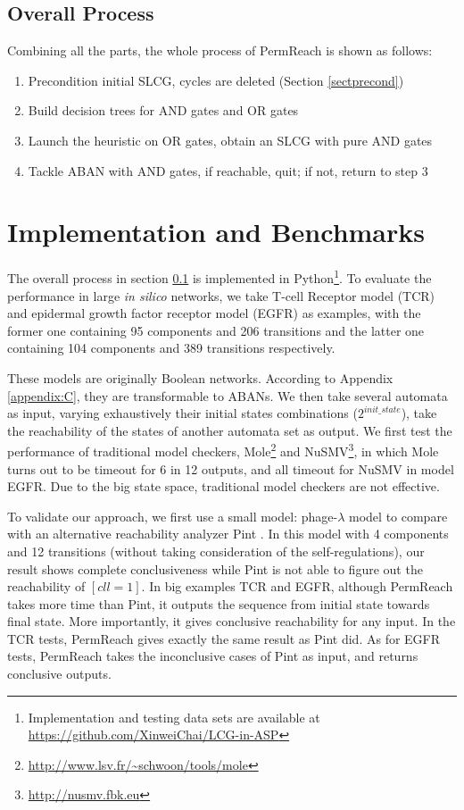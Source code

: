 \documentclass[runningheads]{llncs}
\begin{document}
\subsection{Overall Process}\label{sectOverall}
Combining all the parts, the whole process of PermReach is shown as follows:
\begin{enumerate}
\item Precondition initial SLCG, cycles are deleted (Section \ref{sectprecond})
\item Build decision trees for AND gates and OR gates
\item Launch the heuristic on OR gates, obtain an SLCG with pure AND gates 
\item Tackle ABAN with AND gates, if reachable, quit; if not, return to step 3 
\end{enumerate}

\section{Implementation and Benchmarks}\label{sect:5}
The overall process in section \ref{sectOverall} is implemented in Python\footnote{Implementation and testing data sets are available at \url{https://github.com/XinweiChai/LCG-in-ASP}}. 
To evaluate the performance in large \textit{in silico} networks, we take T-cell Receptor model (TCR) \cite{saez2007logical} and epidermal growth factor receptor model (EGFR) \cite{samaga2009logic} as examples, with the former one containing 95 components and 206 transitions and the latter one containing 104 components and 389 transitions respectively. 

These models are originally Boolean networks.
According to Appendix \ref{appendix:C}, they are transformable to ABANs. We then take several automata as input, varying exhaustively their initial states combinations ($2^{init\_state}$), take the reachability of the states of another automata set as output.
We first test the performance of traditional model checkers, Mole\footnote{\url{http://www.lsv.fr/~schwoon/tools/mole}} and NuSMV\footnote{\url{http://nusmv.fbk.eu}}, in which Mole turns out to be timeout for 6 in 12 outputs, and all timeout for NuSMV in model EGFR.
Due to the big state space, traditional model checkers are not effective. 

To validate our approach, we first use a small model: phage-$\lambda$ model \cite{thieffry1995dynamical} to compare with an alternative reachability analyzer Pint \cite{pauleve2012}. In this model with 4 components and 12 transitions (without taking consideration of the self-regulations), our result shows complete conclusiveness while Pint is not able to figure out the reachability of $[cll=1]$. 
In big examples TCR and EGFR,
although PermReach takes more time than Pint, it outputs the sequence from initial state towards final state.
More importantly, it gives conclusive reachability for any input. 
In the TCR tests, PermReach gives exactly the same result as Pint did. As for EGFR tests, PermReach takes the inconclusive cases of Pint as input, and returns conclusive outputs.
\end{document}
